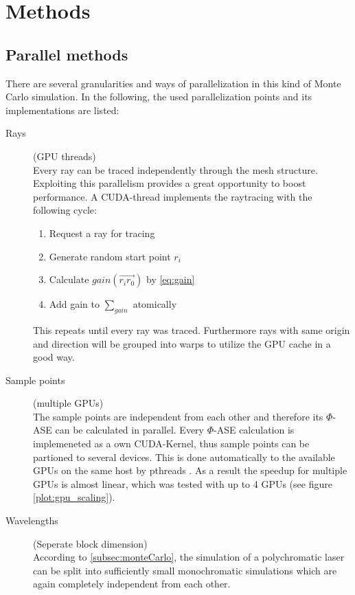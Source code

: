 \section{Methods}
\subsection{Parallel methods}
There are several granularities and ways of parallelization in this kind of 
Monte Carlo simulation. In the following, the used parallelization points and
its implementations are listed:

\begin{description}

\item[Rays] (GPU threads)\\
    Every ray can be traced independently through the mesh structure.
    Exploiting this parallelism provides a great opportunity to boost
    performance. A CUDA-thread implements the raytracing with the 
    following cycle:
    \begin{enumerate}
      \item Request a ray for tracing
      \item Generate random start point $r_i$
      \item Calculate $gain(\overrightarrow{r_ir_0})$ by \eqref{eq:gain}
      \item Add gain to $\sum_{gain}$ atomically
    \end{enumerate}
    This repeats until every ray was traced. Furthermore rays with same
    origin and direction will be grouped into warps to utilize the
    GPU cache in a good way.

  \item[Sample points] (multiple GPUs)\\
    The sample points are independent from each other
    and therefore its $\Phi$-ASE can be calculated in parallel. Every $\Phi$-ASE
    calculation is implemeneted as a own CUDA-Kernel, thus sample points can be partioned 
    to several devices. This is done automatically to the available GPUs on
    the same host by pthreads \cite{pthreads}. As a result the speedup for multiple
    GPUs is almost linear, which was tested with up to 4 GPUs (see figure \ref{plot:gpu_scaling}).

  \item[Wavelengths] (Seperate block dimension)\\
    According to \ref{subsec:monteCarlo}, the simulation of a polychromatic
    laser can be split into sufficiently small monochromatic simulations which
    are again completely independent from each other.

\end{description}

